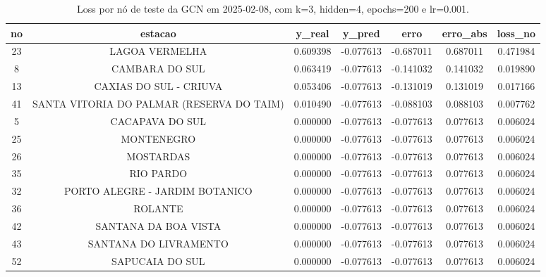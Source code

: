 \begin{table}[h]
\centering
\caption{Loss por nó de teste da GCN em 2025-02-08, com k=3, hidden=4, epochs=200 e lr=0.001.}
\label{tab:gcn_loss_nodes_k3_hidden4}
\begin{tabular}{ccccccc}
\toprule
no & estacao & y\_real & y\_pred & erro & erro\_abs & loss\_no \\
\midrule
23 & LAGOA VERMELHA & 0.609398 & -0.077613 & -0.687011 & 0.687011 & 0.471984 \\
8 & CAMBARA DO SUL & 0.063419 & -0.077613 & -0.141032 & 0.141032 & 0.019890 \\
13 & CAXIAS DO SUL - CRIUVA & 0.053406 & -0.077613 & -0.131019 & 0.131019 & 0.017166 \\
41 & SANTA VITORIA DO PALMAR (RESERVA DO TAIM) & 0.010490 & -0.077613 & -0.088103 & 0.088103 & 0.007762 \\
5 & CACAPAVA DO SUL & 0.000000 & -0.077613 & -0.077613 & 0.077613 & 0.006024 \\
25 & MONTENEGRO & 0.000000 & -0.077613 & -0.077613 & 0.077613 & 0.006024 \\
26 & MOSTARDAS & 0.000000 & -0.077613 & -0.077613 & 0.077613 & 0.006024 \\
35 & RIO PARDO & 0.000000 & -0.077613 & -0.077613 & 0.077613 & 0.006024 \\
32 & PORTO ALEGRE - JARDIM BOTANICO & 0.000000 & -0.077613 & -0.077613 & 0.077613 & 0.006024 \\
36 & ROLANTE & 0.000000 & -0.077613 & -0.077613 & 0.077613 & 0.006024 \\
42 & SANTANA DA BOA VISTA & 0.000000 & -0.077613 & -0.077613 & 0.077613 & 0.006024 \\
43 & SANTANA DO LIVRAMENTO & 0.000000 & -0.077613 & -0.077613 & 0.077613 & 0.006024 \\
52 & SAPUCAIA DO SUL & 0.000000 & -0.077613 & -0.077613 & 0.077613 & 0.006024 \\
\bottomrule
\end{tabular}
\end{table}
